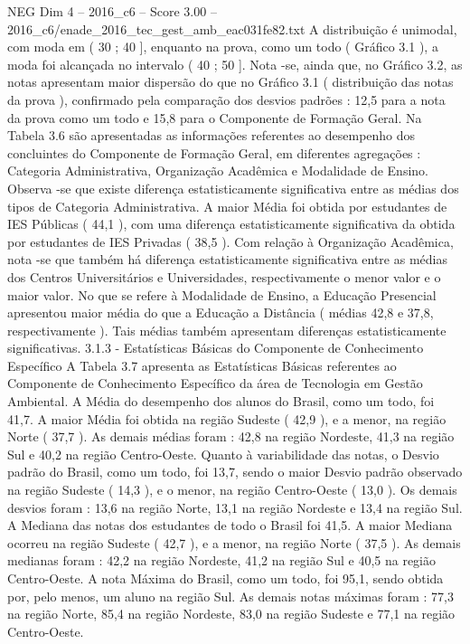 \begin{textsample}{NEG Dim 4 – 2016\_c6 – Score 3.00 – 2016\_c6/enade\_2016\_tec\_gest\_amb\_eac031fe82.txt}
A distribuição é unimodal, com moda em ( 30 ; 40 ], enquanto na prova, como um todo ( Gráfico 3.1 ), a moda foi alcançada no intervalo ( 40 ; 50 ].
Nota -se, ainda que, no Gráfico 3.2, as notas apresentam maior dispersão do que no Gráfico 3.1 ( distribuição das notas da prova ), confirmado pela comparação dos desvios padrões : 12,5 para a nota da prova como um todo e 15,8 para o Componente de Formação Geral.
Na Tabela 3.6 são apresentadas as informações referentes ao desempenho dos concluintes do Componente de Formação Geral, em diferentes agregações : Categoria Administrativa, Organização Acadêmica e Modalidade de Ensino.
Observa -se que existe diferença estatisticamente significativa entre as médias dos tipos de Categoria Administrativa.
A maior Média foi obtida por estudantes de IES Públicas ( 44,1 ), com uma diferença estatisticamente significativa da obtida por estudantes de IES Privadas ( 38,5 ).
Com relação à Organização Acadêmica, nota -se que também há diferença estatisticamente significativa entre as médias dos Centros Universitários e Universidades, respectivamente o menor valor e o maior valor.
No que se refere à Modalidade de Ensino, a Educação Presencial apresentou maior média do que a Educação a Distância ( médias 42,8 e 37,8, respectivamente ).
Tais médias também apresentam diferenças estatisticamente significativas. 3.1.3 - Estatísticas Básicas do Componente de Conhecimento Específico A Tabela 3.7 apresenta as Estatísticas Básicas referentes ao Componente de Conhecimento Específico da área de Tecnologia em Gestão Ambiental.
A Média do desempenho dos alunos do Brasil, como um todo, foi 41,7.
A maior Média foi obtida na região Sudeste ( 42,9 ), e a menor, na região Norte ( 37,7 ).
As demais médias foram : 42,8 na região Nordeste, 41,3 na região Sul e 40,2 na região Centro-Oeste.
Quanto à variabilidade das notas, o Desvio padrão do Brasil, como um todo, foi 13,7, sendo o maior Desvio padrão observado na região Sudeste ( 14,3 ), e o menor, na região Centro-Oeste ( 13,0 ).
Os demais desvios foram : 13,6 na região Norte, 13,1 na região Nordeste e 13,4 na região Sul.
A Mediana das notas dos estudantes de todo o Brasil foi 41,5.
A maior Mediana ocorreu na região Sudeste ( 42,7 ), e a menor, na região Norte ( 37,5 ).
As demais medianas foram : 42,2 na região Nordeste, 41,2 na região Sul e 40,5 na região Centro-Oeste.
A nota Máxima do Brasil, como um todo, foi 95,1, sendo obtida por, pelo menos, um aluno na região Sul.
As demais notas máximas foram : 77,3 na região Norte, 85,4 na região Nordeste, 83,0 na região Sudeste e 77,1 na região Centro-Oeste.

\end{textsample}
